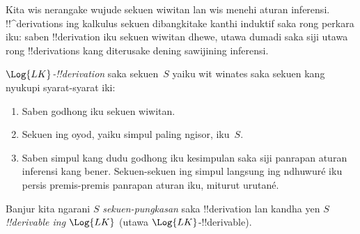 \documentclass[../../../include/open-logic-section]{subfiles}
\begin{document}
      {}
      {}


\begin{explain}
Kita wis nerangake wujude sekuen wiwitan lan wis menehi aturan
inferensi. !!^{derivation}s ing kalkulus sekuen dibangkitake kanthi
induktif saka rong perkara iku: saben !!{derivation} iku sekuen
wiwitan dhewe, utawa dumadi saka siji utawa rong !!{derivation}s kang
diterusake dening sawijining inferensi.
\end{explain}

\begin{defn}
\emph{$\Log{LK}$-!!{derivation}} saka sekuen~$S$ yaiku wit winates
saka sekuen kang nyukupi syarat-syarat iki:
\begin{enumerate}
\item Saben godhong iku sekuen wiwitan.
\item Sekuen ing oyod, yaiku simpul paling ngisor, iku~$S$.
\item Saben simpul kang dudu godhong iku kesimpulan saka siji panrapan
  aturan inferensi kang bener. Sekuen-sekuen ing simpul langsung
  ing ndhuwuré iku persis premis-premis panrapan aturan iku, miturut
  urutané.
\end{enumerate}
Banjur kita ngarani $S$ \emph{sekuen-pungkasan} saka !!{derivation}
lan kandha yen $S$ \emph{!!{derivable} ing $\Log{LK}$} (utawa
$\Log{LK}$-!!{derivable}).
\end{defn}
\end{document}
